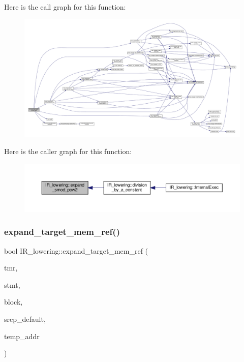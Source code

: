 Here is the call graph for this function\+:
\nopagebreak
\begin{figure}[H]
\begin{center}
\leavevmode
\includegraphics[width=350pt]{df/d7d/classIR__lowering_ab4fe755c5983da121948673fbcc4faea_cgraph}
\end{center}
\end{figure}
Here is the caller graph for this function\+:
\nopagebreak
\begin{figure}[H]
\begin{center}
\leavevmode
\includegraphics[width=350pt]{df/d7d/classIR__lowering_ab4fe755c5983da121948673fbcc4faea_icgraph}
\end{center}
\end{figure}
\mbox{\label{classIR__lowering_a374c0d4f54d89c8937343259e202e1b1}} 
\subsubsection{\texorpdfstring{expand\+\_\+target\+\_\+mem\+\_\+ref()}{expand\_target\_mem\_ref()}}
{\footnotesize\ttfamily bool I\+R\+\_\+lowering\+::expand\+\_\+target\+\_\+mem\+\_\+ref (\begin{DoxyParamCaption}\item[{\hyperlink{structtarget__mem__ref461}{target\+\_\+mem\+\_\+ref461} $\ast$}]{tmr,  }\item[{const \hyperlink{tree__node_8hpp_a6ee377554d1c4871ad66a337eaa67fd5}{tree\+\_\+node\+Ref}}]{stmt,  }\item[{const bloc\+Ref}]{block,  }\item[{const std\+::string \&}]{srcp\+\_\+default,  }\item[{bool}]{temp\+\_\+addr }\end{DoxyParamCaption})\hspace{0.3cm}{\ttfamily [private]}}

